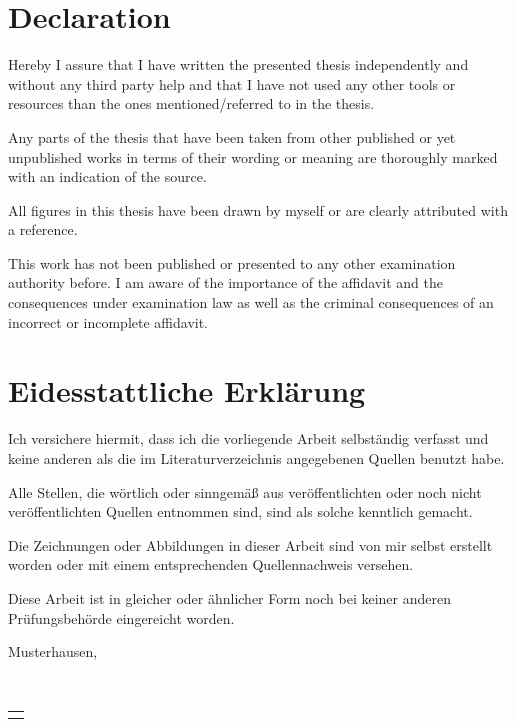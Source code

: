 
\ifdefined\ThesisLanguageIsEnglish
	\chapter*{Declaration}
		\thispagestyle{empty}
		Hereby I assure that I have written the presented thesis independently and without any third party help and that I have not used any other tools or resources than the ones mentioned/referred to in the thesis.
	\medskip

	\noindent
		Any parts of the thesis that have been taken from other published or yet unpublished works in terms of their wording or meaning are thoroughly marked with an indication of the source. 
	\medskip

	\noindent
		All figures in this thesis have been drawn by myself or are clearly attributed with a reference. 
	\medskip

	\noindent
		This work has not been published or presented to any other examination authority before.
		I am aware of the importance of the affidavit and the consequences under examination
		law as well as the criminal consequences of an incorrect or incomplete affidavit.
	\medskip


\else
	\chapter*{Eidesstattliche Erklärung}
		\thispagestyle{empty}
			Ich versichere hiermit, dass ich die vorliegende Arbeit selbständig verfasst und keine anderen als die im Literaturverzeichnis angegebenen Quellen benutzt habe.
		\medskip

		\noindent
			Alle Stellen, die wörtlich oder sinngemäß aus veröffentlichten oder noch nicht veröffentlichten Quellen entnommen sind, sind als solche kenntlich gemacht.
		\medskip

		\noindent
			Die Zeichnungen oder Abbildungen in dieser Arbeit sind von mir selbst erstellt worden oder mit einem entsprechenden Quellennachweis versehen.
		\medskip

		\noindent
			Diese Arbeit ist in gleicher oder ähnlicher Form noch bei keiner anderen Prüfungsbehörde eingereicht worden. 
		\bigskip
\fi

Musterhausen, \ThesisDeliveryDate

\smallskip
\hfill {\raisebox{-2ex}{\ \ }} \\ 
\vspace*{-1.7cm}
\begin{flushright}
	\begin{tabular}{m{5cm}}
		\\ \hline
		\centering \textbf{\NameA}\\
	\end{tabular}
\end{flushright}

